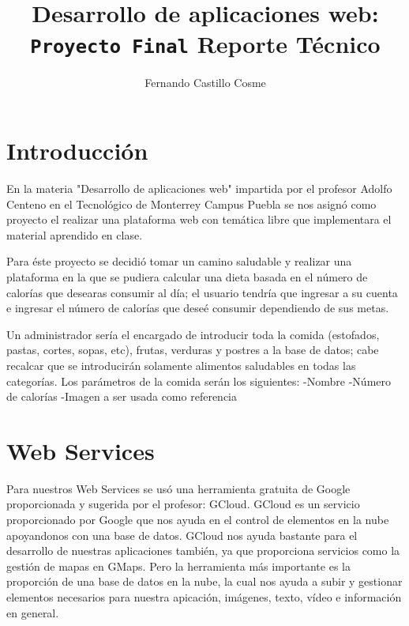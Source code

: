 \documentclass[a4paper,10pt]{article}
\title{Desarrollo de aplicaciones web:\\\texttt{Proyecto Final} Reporte Técnico}
\author{Fernando Castillo Cosme}
\begin{document}
\maketitle
{}

\tableofcontents
\newpage

\section{Introducción}
En la materia "Desarrollo de aplicaciones web" impartida por el profesor Adolfo Centeno en el Tecnológico de Monterrey Campus Puebla se nos asignó como proyecto el realizar una plataforma web con temática libre que implementara el material aprendido en clase.\linebreak

Para éste proyecto se decidió tomar un camino saludable y realizar una plataforma en la que se pudiera calcular una dieta basada en el número de calorías que desearas consumir al día; el usuario tendría que ingresar a su cuenta e ingresar el número de calorías que deseé consumir dependiendo de sus metas.\linebreak

Un administrador sería el encargado de introducir toda la comida (estofados, pastas, cortes, sopas, etc), frutas, verduras y postres a la base de datos; cabe recalcar que se introducirán solamente alimentos saludables en todas las categorías. Los parámetros de la comida serán los siguientes:
\newline
-Nombre
\newline
-Número de calorías
\newline
-Imagen a ser usada como referencia
\newline

\section{Web Services}
Para nuestros Web Services se usó una herramienta gratuita de Google proporcionada y sugerida por el profesor: GCloud.
GCloud es un servicio proporcionado por Google que nos ayuda en el control de elementos en la nube apoyandonos con una base de datos.
GCloud nos ayuda bastante para el desarrollo de nuestras aplicaciones también, ya que proporciona servicios como la gestión de mapas en GMaps. Pero la herramienta más importante es la proporción de una base de datos en la nube, la cual nos ayuda a subir y gestionar elementos necesarios para nuestra apicación, imágenes, texto, vídeo e información en general.
\newline
\end{document}
